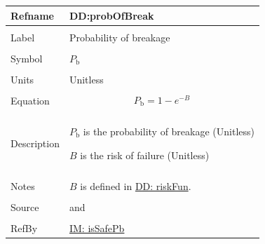 \documentclass[12pt]{article}
\begin{document}
\vspace{\baselineskip}
\noindent
\begin{minipage}{\textwidth}
\begin{tabular}{>{\raggedright}p{}>{\raggedright\arraybackslash}p{}}
\toprule \textbf{Refname} & \textbf{DD:probOfBreak}
\label{DD:probOfBreak}
\\ \midrule \\
Label & Probability of breakage
        
\\ \midrule \\
Symbol & ${P_{\text{b}}}$
         
\\ \midrule \\
Units & Unitless
        
\\ \midrule \\
Equation & \begin{displaymath}
           {P_{\text{b}}}=1-e^{-B}
           \end{displaymath}
\\ \midrule \\
Description & \begin{symbDescription}
              \item{${P_{\text{b}}}$ is the probability of breakage (Unitless)}
              \item{$B$ is the risk of failure (Unitless)}
              \end{symbDescription}
\\ \midrule \\
Notes & $B$ is defined in \hyperref[DD:riskFun]{DD: riskFun}.
        
\\ \midrule \\
Source & \cite{astm2009} and \cite{beasonEtAl1998}
         
\\ \midrule \\
RefBy & \hyperref[IM:isSafePb]{IM: isSafePb}
        
\\ \bottomrule
\end{tabular}
\end{minipage}
\end{document}
